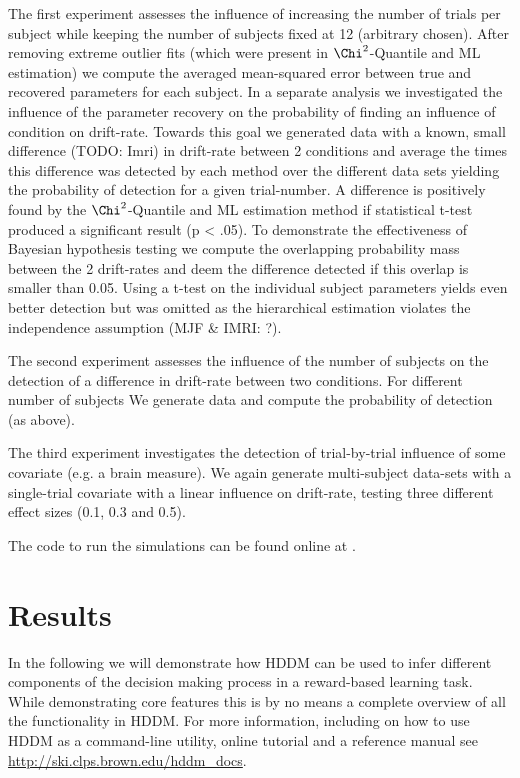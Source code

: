 \documentclass[letterpaper,10pt,english]{article}
\begin{document}
The first experiment assesses the influence of increasing the number of trials per subject while keeping the number of subjects fixed at 12 (arbitrary chosen). After removing extreme outlier fits (which were present in $\Chi^2$-Quantile and ML estimation) we compute the averaged mean-squared error between true and recovered parameters for each subject. In a separate analysis we investigated the influence of the parameter recovery on the probability of finding an influence of condition on drift-rate. Towards this goal we generated data with a known, small difference (TODO: Imri) in drift-rate between 2 conditions and average the times this difference was detected by each method over the different data sets yielding the probability of detection for a given trial-number. A difference is positively found by the $\Chi^2$-Quantile and ML estimation method if statistical t-test produced a significant result (p < .05). To demonstrate the effectiveness of Bayesian hypothesis testing we compute the overlapping probability mass between the 2 drift-rates and deem the difference detected if this overlap is smaller than 0.05. Using a t-test on the individual subject parameters yields even better detection but was omitted as the hierarchical estimation violates the independence assumption (MJF \& IMRI: ?).

The second experiment assesses the influence of the number of subjects on the detection of a difference in drift-rate between two conditions. For different number of subjects We generate data and compute the probability of detection (as above).

The third experiment investigates the detection of trial-by-trial influence of some covariate (e.g. a brain measure). We again generate multi-subject data-sets with a single-trial covariate with a linear influence on drift-rate, testing three different effect sizes (0.1, 0.3 and 0.5).

The code to run the simulations can be found online at .

\section*{Results}
\label{demo:index-0}\label{demo:demo}\label{demo:chap-demo}\label{demo::doc}\label{demo:patsy}
In the following we will demonstrate how HDDM can be used to infer different components of the decision making process in a reward-based learning task. While demonstrating core features this is by no means a complete overview of all the functionality in HDDM. For more information, including on how to use HDDM as a command-line utility, online tutorial and a reference manual see \href{http://ski.clps.brown.edu/hddm\_docs}{http://ski.clps.brown.edu/hddm\_docs}.
\end{document}
